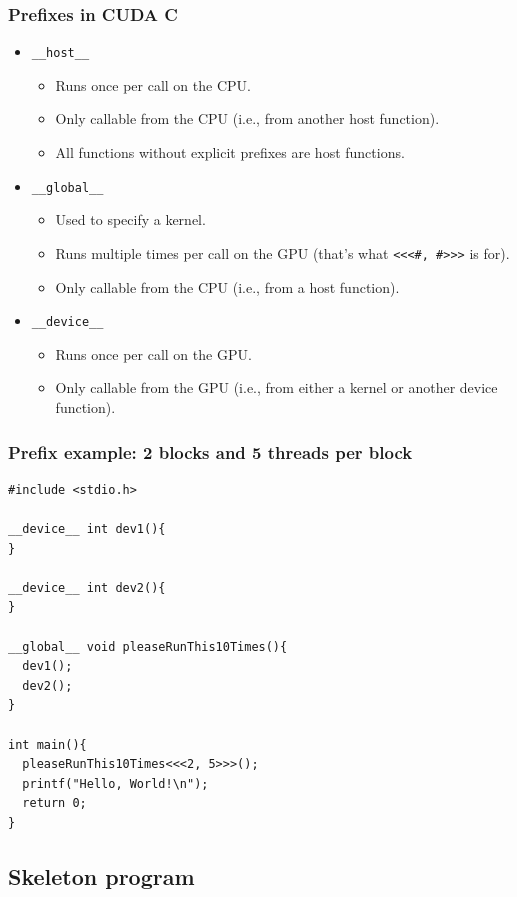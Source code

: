 \documentclass[handout]{beamer}
\numberwithin{equation}{section}
\begin{document}
\begin{frame}
\frametitle{Prefixes in CUDA C} \small
\begin{itemize}
\pause \item {\tt \_\_host\_\_}
\begin{itemize}
\pause \item Runs once per call on the CPU.
\pause \item Only callable from the CPU (i.e., from another host function).
\pause \item All functions without explicit prefixes are host functions.
\end{itemize}
\pause \item {\tt \_\_global\_\_}
\begin{itemize}
\pause \item Used to specify a kernel.
\pause \item Runs multiple times per call on the GPU (that's what {\tt <<<\#, \#>>>} is for).
\pause \item Only callable from the CPU (i.e., from a host function).
\end{itemize}
\pause \item {\tt \_\_device\_\_}
\begin{itemize}
\pause \item Runs once per call on the GPU.
\pause \item Only callable from the GPU (i.e., from either a kernel or another device function).
\end{itemize}
\end{itemize}
\end{frame}

\begin{frame}[fragile]
\frametitle{Prefix example: 2 blocks and 5 threads per block}
\begin{lstlisting}
#include <stdio.h>

__device__ int dev1(){
}

__device__ int dev2(){
}

__global__ void pleaseRunThis10Times(){
  dev1();
  dev2();
}

int main(){
  pleaseRunThis10Times<<<2, 5>>>();
  printf("Hello, World!\n");
  return 0;
}
\end{lstlisting}
\end{frame}

\subsection{Skeleton program}
\end{document}

